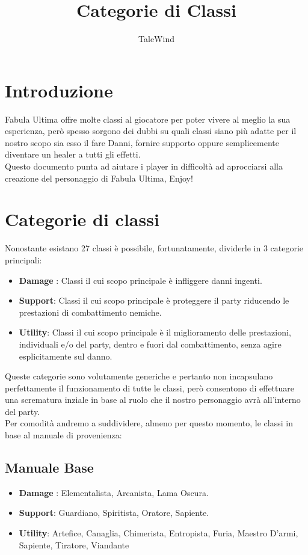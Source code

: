 \documentclass{article}
\title{Categorie di Classi}
\author{TaleWind}
\begin{document}
\maketitle
\tableofcontents
\section{Introduzione}
Fabula Ultima offre molte classi al giocatore per poter vivere al meglio la sua esperienza, però spesso sorgono dei dubbi su quali classi siano più adatte per il nostro scopo sia esso il fare Danni, fornire supporto oppure semplicemente diventare un healer a tutti gli effetti.\\
Questo documento punta ad aiutare i player in difficoltà ad aprocciarsi alla creazione del personaggio di Fabula Ultima, Enjoy!

\section{Categorie di classi}
Nonostante esistano 27 classi è possibile, fortunatamente, dividerle in 3 categorie principali:
\begin{itemize}
    \item \textbf{Damage} : Classi il cui scopo principale è infliggere danni ingenti.
    \item \textbf{Support}: Classi il cui scopo principale è proteggere il party riducendo le prestazioni di combattimento nemiche.
    \item \textbf{Utility}: Classi il cui scopo principale è il miglioramento delle prestazioni, individuali e/o del party, dentro e fuori dal combattimento, senza agire esplicitamente sul danno.
\end{itemize}
Queste categorie sono volutamente generiche e pertanto non incapsulano perfettamente il funzionamento di 
tutte le classi, però consentono di effettuare una scrematura inziale in base al ruolo che il nostro personaggio 
avrà all'interno del party.\\
Per comodità andremo a suddividere, almeno per questo momento, le classi in base al manuale di provenienza:
\subsection{Manuale Base}
\begin{itemize}
    \item \textbf{Damage} : Elementalista, Arcanista, Lama Oscura.
    \item \textbf{Support}: Guardiano, Spiritista, Oratore, Sapiente.
    \item \textbf{Utility}: Artefice, Canaglia, Chimerista, Entropista, Furia, Maestro D'armi, Sapiente, Tiratore, Viandante
\end{itemize}
\end{document}
